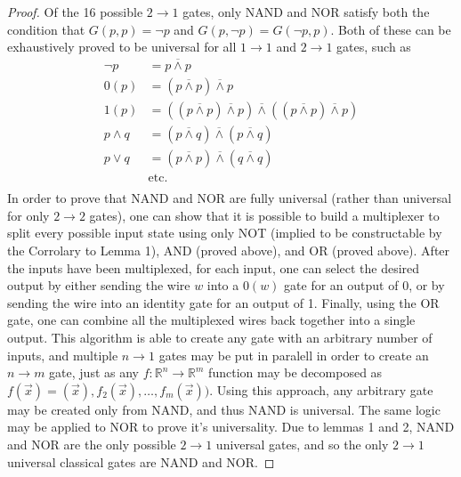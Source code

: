 \documentclass[12pt]{article}
\newcommand{\nand}{\overline{\land}}
\begin{document}
\begin{proof}
    Of the 16 possible $2 \to 1$ gates, only NAND and NOR satisfy both the condition that $G(p, p) = \neg p$ and $G(p, \neg p) = G(\neg p, p)$.
    Both of these can be exhaustively proved to be universal for all $1 \to 1$ and $2 \to 1$ gates, such as
    \begin{align}
        \neg p &= p \nand p \\
        0(p) &= (p \nand p) \nand p \\
        1(p) &= ((p \nand p) \nand p) \nand ((p \nand p) \nand p) \\
        p \land q &= (p \nand q) \nand (p \nand q) \\
        p \lor q &= (p \nand p) \nand (q \nand q) \\
        &\text{etc.} \\
    \end{align}
    In order to prove that NAND and NOR are fully universal (rather than universal for only $2 \to 2$ gates), one can show that it is possible to build a multiplexer to split every possible input state using only NOT (implied to be constructable by the Corrolary to Lemma 1), AND (proved above), and OR (proved above). After the inputs have been multiplexed, for each input, one can select the desired output by either sending the wire $w$ into a $0(w)$ gate for an output of 0, or by sending the wire into an identity gate for an output of 1. Finally, using the OR gate, one can combine all the multiplexed wires back together into a single output.
    This algorithm is able to create any gate with an arbitrary number of inputs, and multiple $n \to 1$ gates may be put in paralell in order to create an $n \to m$ gate, just as any $f: \mathbb{R}^n \to \mathbb{R}^m$ function may be decomposed as $f(\overrightarrow{x}) = (\overrightarrow{x}), f_2(\overrightarrow{x}), \dots, f_m(\overrightarrow{x}))$.
    Using this approach, any arbitrary gate may be created only from NAND, and thus NAND is universal. The same logic may be applied to NOR to prove it's universality. Due to lemmas 1 and 2, NAND and NOR are the only possible $2 \to 1$ universal gates, and so the only $2 \to 1$ universal classical gates are NAND and NOR.
\end{proof}
\end{document}
